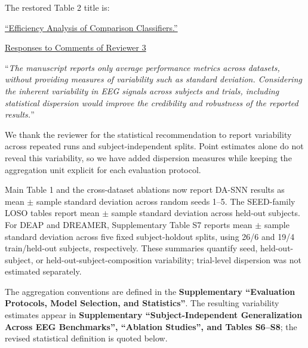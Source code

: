 \documentclass[12pt,technote,onecolumn]{IEEEtran}
\begin{document}
The restored Table 2 title is:

\uline{``Efficiency Analysis of Comparison Classifiers.''}

\EvidenceMainTableOne
\EvidenceMainTableTwo

\newpage
\clearpage
\begin{center}
\underline{Responses to Comments of Reviewer 3}
\end{center}
\vspace{3mm}

\vspace{4mm}

``{\it The manuscript reports only average performance metrics across datasets,
without providing measures of variability such as standard deviation.
Considering the inherent variability in EEG signals across subjects and
trials, including statistical dispersion would improve the credibility
and robustness of the reported results.}''
\vspace{1mm}


We thank the reviewer for the statistical recommendation to report variability across repeated runs and subject-independent splits. Point estimates alone do not reveal this variability, so we have added dispersion measures while keeping the aggregation unit explicit for each evaluation protocol.

Main Table 1 and the cross-dataset ablations now report DA-SNN results
as mean $\pm$ sample standard deviation across random seeds 1--5. The
SEED-family LOSO tables report mean $\pm$ sample standard deviation across
held-out subjects. For DEAP and DREAMER, Supplementary Table S7 reports
mean $\pm$ sample standard deviation across five fixed subject-holdout
splits, using 26/6 and 19/4 train/held-out subjects, respectively. These
summaries quantify seed, held-out-subject, or
held-out-subject-composition variability; trial-level dispersion was not
estimated separately.



The aggregation conventions are defined in the \textbf{Supplementary ``Evaluation Protocols, Model Selection, and Statistics''}. The resulting variability estimates appear in \textbf{Supplementary ``Subject-Independent Generalization Across EEG Benchmarks'', ``Ablation Studies'', and Tables S6--S8}; the revised statistical definition is quoted below.
\end{document}
